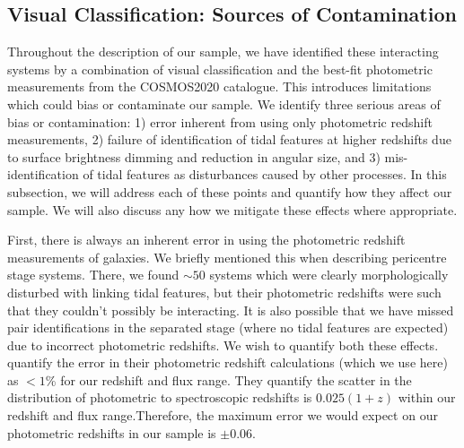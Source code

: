 \subsection{Visual Classification: Sources of Contamination}
\noindent Throughout the description of our sample, we have identified these interacting systems by a combination of visual classification and the best-fit photometric measurements from the COSMOS2020 catalogue. This introduces limitations which could bias or contaminate our sample. We identify three serious areas of bias or contamination: 1) error inherent from using only photometric redshift measurements, 2) failure of identification of tidal features at higher redshifts due to surface brightness dimming and reduction in angular size, and 3) mis-identification of tidal features as disturbances caused by other processes. In this subsection, we will address each of these points and quantify how they affect our sample. We will also discuss any how we mitigate these effects where appropriate.

First, there is always an inherent error in using the photometric redshift measurements of galaxies. We briefly mentioned this when describing pericentre stage systems. There, we found $\sim50$ systems which were clearly morphologically disturbed with linking tidal features, but their photometric redshifts were such that they couldn't possibly be interacting. It is also possible that we have missed pair identifications in the separated stage (where no tidal features are expected) due to incorrect photometric redshifts. We wish to quantify both these effects. \citet{2022ApJS..258...11W} quantify the error in their photometric redshift calculations (which we use here) as $<1$\% for our redshift and flux range. They quantify the scatter in the distribution of photometric to spectroscopic redshifts is $0.025(1+z)$ within our redshift and flux range.Therefore, the maximum error we would expect on our photometric redshifts in our sample is $\pm0.06$.

